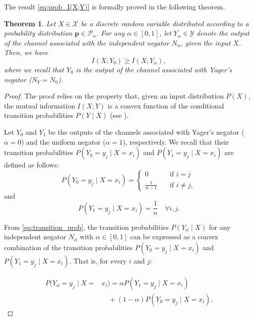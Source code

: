 \documentclass[pdflatex,sn-basic,iicol]{sn-jnl}%
\theoremstyle{thmstyleone}%
\newtheorem{theorem}{Theorem}%
\theoremstyle{thmstyletwo}%
\theoremstyle{thmstylethree}%
\newcommand{\cP}{\mathcal{P}}
\newcommand{\bp}{\mathbf{p}}
\begin{document}
The result \eqref{eq:prob_I(X;Y)} is formally proved in the following theorem.
\begin{theorem}\label{th:max_mutual_information}
    Let $X\in \mathcal{X}$ be a discrete random variable distributed according to a probability distribution $\bp\in\cP_n$. For any $\alpha\in[0,1]$, let $Y_\alpha\in\mathcal{Y}$ denote the output of the channel associated with the independent negator $N_\alpha$, given the input $X$. Then, we have 
    \begin{equation}
        I(X;Y_0)\geq I(X;Y_{\alpha}),
    \end{equation}
    where we recall that $Y_0$ is the output of the channel associated with Yager's negator ($N_Y=N_0$).
\end{theorem}
\begin{proof}
    The proof relies on the property that, given an input distribution $P(X)$, the mutual information $I(X;Y)$ is a convex function of the conditional transition probabilities $P(Y\mid X)$ (see \cite{mceliece2002theory}).

    Let $Y_0$ and $Y_1$ be the outputs of the channels associated with Yager's negator ($\alpha=0$) and the uniform negator ($\alpha=1$), respectively. We recall that their transition probabilities $ P(Y_0=y_j\mid X=x_i)$ and $ P(Y_1=y_j\mid X=x_i)$ are defined as follows:
    \begin{equation*}
        P(Y_0=y_j\mid X=x_i)=\begin{cases}
            0\quad&\mbox{if } i=j\\
            \frac{1}{n-1}\quad&\mbox{if } i\neq j,
        \end{cases}
    \end{equation*}
    and
    \begin{equation*}
         P(Y_1=y_j\mid X=x_i) = \frac{1}{n} \quad\forall i,j.
    \end{equation*}

From   \eqref{eq:transition_prob}, the transition probabilities  ${P(Y_\alpha\mid X)}$ for any independent negator $N_\alpha$ with $\alpha\in[0,1]$ can be expressed as a convex combination of the transition probabilities ${P(Y_0=y_j\mid X=x_i)}$ and ${P(Y_1=y_j\mid X=x_i)}$. That is, for every $i$ and $j$:
    
    \begin{align}\label{eq:convex_prob}
        P(Y_\alpha =y_j\mid X=& x_i)=\nonumber \alpha P(Y_1=y_j\mid X=x_i)\nonumber\\&\quad+ (1-\alpha)P(Y_0=y_j\mid X=x_i).
    \end{align}


\end{proof}
\end{document}
